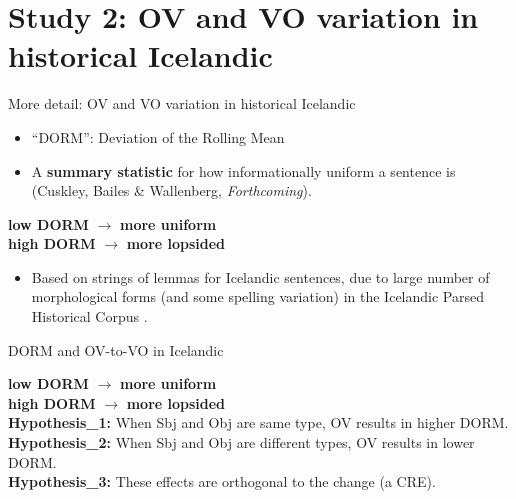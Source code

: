\documentclass[hyperref={pdfpagelabels=false}]{beamer}
\begin{document}
\section{Study 2: OV and VO variation in historical Icelandic}


\begin{frame}{More detail: OV and VO variation in historical Icelandic} 

\begin{itemize}
	\item ``DORM'': Deviation of the Rolling Mean
	\item A \textbf{summary statistic} for how informationally uniform a sentence is (Cuskley, Bailes \& Wallenberg, \textsl{Forthcoming}).\pause
\end{itemize}
	\begin{center}
		 \textbf{low DORM} $\rightarrow$ \textbf{more uniform}\\
		 \textbf{high DORM} $\rightarrow$ \textbf{more lopsided}
	\end{center}\pause
\begin{itemize}

	\item Based on strings of lemmas for Icelandic sentences, due to large number of morphological forms (and some spelling variation) in the Icelandic Parsed Historical Corpus \citep{icepahc09}.
\end{itemize}

\end{frame}


\begin{frame}{DORM and OV-to-VO in Icelandic} 
	
	\begin{center}

		\textbf{low DORM} $\rightarrow$ \textbf{more uniform}\\
		\textbf{high DORM} $\rightarrow$ \textbf{more lopsided}\\\vspace{4mm}
		\textbf{Hypothesis_1:} When Sbj and Obj are same type, OV results in higher DORM.\\\pause
		\textbf{Hypothesis_2:} When Sbj and Obj are different types, OV results in lower DORM.\\\pause
		\textbf{Hypothesis_3:} These effects are orthogonal to the change (a CRE).\\
	\end{center}
	
\end{frame}
\end{document}
